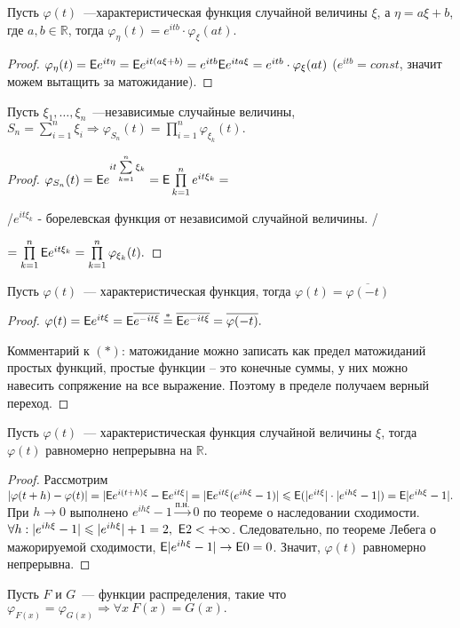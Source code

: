  \begin{property}
		Пусть $\varphi(t)$~---характеристическая функция случайной величины $\xi$, а $\eta = a\xi + b$, где $a, b \in \mathbb{R}$, тогда $\varphi_\eta(t) = e^{itb}\cdot \varphi_\xi(at).$
		\begin{proof}
			$\varphi_\eta(t) = \mathsf{E} e^{it\eta} = \mathsf{E} e^{it(a\xi + b)} = e^{itb} \mathsf{E} e^{ita\xi} = e^{itb}\cdot \varphi_\xi(at)$ ($e^{itb} = const$, значит можем вытащить за матожидание).
		\end{proof}
	\end{property}

	\begin{property}
		Пусть $\xi_1, \ldots, \xi_n$~---независимые случайные величины, $S_n = \sum\limits_{i = 1}^{n}\xi_i \Rightarrow \varphi_{S_n}(t) = \prod\limits_{i = 1}^n\varphi_{\xi_k}(t).$  
		\begin{proof}
			$\varphi_{S_n}(t) = \mathsf{E} e^{it \sum\limits_{k = 1}^{n}\xi_k} = \mathsf{E}\prod\limits_{k = 1}^n e^{it\xi_k} =$ 
			
			/$e^{it\xi_k}$ - борелевская функция от независимой случайной величины. / 
			
			$= \prod\limits_{k = 1}^{n}\mathsf{E} e^{it\xi_k} = \prod\limits_{k = 1}^{n}\varphi_{\xi_k}(t).$
		\end{proof}
	\end{property}
	\begin{property}
		Пусть $\varphi(t)$~--- характеристическая функция, тогда $\varphi(t) = \overline{\varphi(-t)}$
		\begin{proof}
			$\varphi(t) = \mathsf{E} e^{it\xi} = \mathsf{E}\overline{e^{-it\xi}} \overset{*}{=} \overline{\mathsf{E} e^{-it\xi}} = \overline{\varphi(-t)}.$
			
			Комментарий к $(*)$: матожидание можно записать как предел матожиданий простых функций, простые функции -- это конечные суммы, у них можно навесить сопряжение на все выражение. Поэтому в пределе получаем верный переход.
		\end{proof}
	\end{property}
	\begin{property}
		Пусть $\varphi(t)$~--- характеристическая функция случайной величины $\xi$, тогда $\varphi(t)$ равномерно непрерывна на $\mathbb{R}.$
		\begin{proof}
			Рассмотрим $|\varphi(t + h) - \varphi(t)| = |\mathsf{E} e^{i(t+h)\xi} - \mathsf{E} e^{it\xi}| = |\mathsf{E} e^{it\xi}(e^{ih\xi} - 1)| \leqslant \mathsf{E} (|e^{it\xi}|\cdot |e^{ih\xi} - 1|) = \mathsf{E} |e^{ih\xi} - 1|.$
			При $h \to 0$ выполнено $e^{ih\xi} - 1 \overset{\text{п.н.}} \longrightarrow 0 $ по теореме о наследовании сходимости. $\forall h: |e^{ih\xi} - 1| \leqslant |e^{ih\xi}| + 1 = 2, ~ \mathsf{E} 2 < +\infty$. Следовательно, по теореме Лебега о мажорируемой сходимости, $\mathsf{E} |e^{ih\xi} - 1| \to \mathsf{E} 0 = 0$. Значит, $\varphi(t)$ равномерно непрерывна.
		\end{proof}
	\end{property}
		\begin{theorem}
		Пусть $F$ и $G$~--- функции распределения, такие что $\varphi_{F(x)} = \varphi_{G(x)} \Rightarrow \forall x\  F(x) = G(x).$
	\end{theorem}
	
